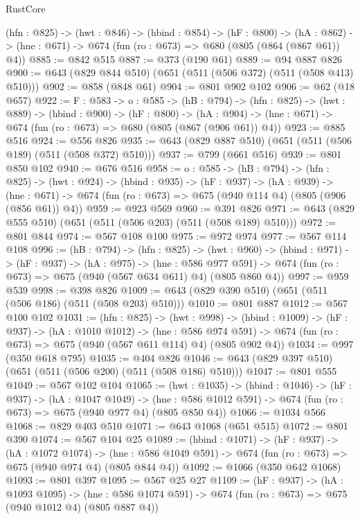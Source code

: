 \begin{lexlean}{RustCore}
\begin{coremodule}
  (hfn : @825) ->
  (hwt : @846) ->
  (hbind : @854) ->
  (hF : @800) ->
  (hA : @862) -> (hne : @671) -> @674 (fun (ro : @673) => @680 (@805 (@864 (@867 @61)) @4))
@885 := @842 @515
@887 := @373 (@190 @61)
@889 := @94 @887 @826
@900 := @643 (@829 @844 @510) (@651 (@511 (@506 @372) (@511 (@508 @413) @510)))
@902 := @858 (@848 @61)
@904 := @801 @902 @102
@906 := @62 (@18 @657)
@922 := {F : @583} ->
  {o : @585} ->
  (hB : @794) ->
  (hfn : @825) ->
  (hwt : @889) ->
  (hbind : @900) ->
  (hF : @800) ->
  (hA : @904) -> (hne : @671) -> @674 (fun (ro : @673) => @680 (@805 (@867 (@906 @61)) @4))
@923 := @885 @516
@924 := @556 @826
@935 := @643 (@829 @887 @510) (@651 (@511 (@506 @189) (@511 (@508 @372) @510)))
@937 := @799 (@661 @516)
@939 := @801 @850 @102
@940 := @676 @516
@958 := {o : @585} ->
  (hB : @794) ->
  (hfn : @825) ->
  (hwt : @924) ->
  (hbind : @935) ->
  (hF : @937) ->
  (hA : @939) ->
  (hne : @671) -> @674 (fun (ro : @673) => @675 (@940 @114 @4) (@805 (@906 (@856 @61)) @4))
@959 := @923 @569
@960 := @391 @826
@971 := @643 (@829 @555 @510) (@651 (@511 (@506 @203) (@511 (@508 @189) @510)))
@972 := @801 @844
@974 := @567 @108 @100
@975 := @972 @974
@977 := @567 @114 @108
@996 := (hB : @794) ->
  (hfn : @825) ->
  (hwt : @960) ->
  (hbind : @971) ->
  (hF : @937) ->
  (hA : @975) ->
  (hne : @586 @977 @591) -> @674 (fun (ro : @673) => @675 (@940 (@567 @634 @611) @4) (@805 @860 @4))
@997 := @959 @539
@998 := @398 @826
@1009 := @643 (@829 @390 @510) (@651 (@511 (@506 @186) (@511 (@508 @203) @510)))
@1010 := @801 @887
@1012 := @567 @100 @102
@1031 := (hfn : @825) ->
  (hwt : @998) ->
  (hbind : @1009) ->
  (hF : @937) ->
  (hA : @1010 @1012) ->
  (hne : @586 @974 @591) -> @674 (fun (ro : @673) => @675 (@940 (@567 @611 @114) @4) (@805 @902 @4))
@1034 := @997 (@350 @618 @795)
@1035 := @404 @826
@1046 := @643 (@829 @397 @510) (@651 (@511 (@506 @200) (@511 (@508 @186) @510)))
@1047 := @801 @555
@1049 := @567 @102 @104
@1065 := (hwt : @1035) ->
  (hbind : @1046) ->
  (hF : @937) ->
  (hA : @1047 @1049) ->
  (hne : @586 @1012 @591) -> @674 (fun (ro : @673) => @675 (@940 @977 @4) (@805 @850 @4))
@1066 := @1034 @566
@1068 := @829 @403 @510
@1071 := @643 @1068 (@651 @515)
@1072 := @801 @390
@1074 := @567 @104 @25
@1089 := (hbind : @1071) ->
  (hF : @937) ->
  (hA : @1072 @1074) ->
  (hne : @586 @1049 @591) -> @674 (fun (ro : @673) => @675 (@940 @974 @4) (@805 @844 @4))
@1092 := @1066 (@350 @642 @1068)
@1093 := @801 @397
@1095 := @567 @25 @27
@1109 := (hF : @937) ->
  (hA : @1093 @1095) ->
  (hne : @586 @1074 @591) -> @674 (fun (ro : @673) => @675 (@940 @1012 @4) (@805 @887 @4))

\end{coremodule}
\end{lexlean}
